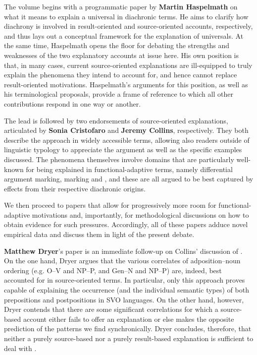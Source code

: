 \documentclass[output=paper]{langsci/langscibook}
\begin{document}
The volume begins with a programmatic paper by \textbf{Martin Haspelmath} on what it means to explain a universal in diachronic terms. He aims to clarify how diachrony is involved in result-oriented and source-oriented accounts, respectively, and thus lays out a  conceptual framework for the explanation of universals. At the same time, Haspelmath opens the floor for debating the strengths and weaknesses of the two explanatory accounts at issue here. His own position is that, in many cases, current source-oriented explanations are ill-equipped to truly explain the phenomena they intend to account for, and hence cannot replace result-oriented motivations. Haspelmath’s arguments for this position, as well as his terminological proposals, provide a frame of reference to which all other contributions respond in one way or another.

The lead  is followed by two endorsements of source-oriented explanations, articulated by \textbf{Sonia Cristofaro} and \textbf{Jeremy Collins}, respectively. They both describe the approach in widely accessible terms, allowing also readers outside of linguistic typology to appreciate the  argument as well as the specific examples discussed. The phenomena themselves involve domains that are particularly well-known for being explained in functional-adaptive terms, namely differential argument marking,  marking and , and these are all argued to be best captured by  effects from their respective diachronic origins.  

We then proceed to papers that allow for progressively more room for functional-adaptive motivations and, importantly, for methodological discussions on how to obtain evidence for such pressures. Accordingly, all of these papers adduce novel empirical data and discuss them in light of the present debate.

\textbf{Matthew Dryer}’s paper is an immediate follow-up on Collins’ discussion of . On the one hand, Dryer argues that the various correlates of adposition–noun ordering (e.g. O–V and NP–P, and Gen–N and NP–P) are, indeed, best accounted for in source-oriented terms. In particular, only this approach proves capable of explaining the occurrence (and the individual semantic types) of both prepositions and postpositions in SVO languages. On the other hand, however, Dryer contends that there are some significant correlations for which a source-based account either fails to offer an explanation or else makes the opposite prediction of the patterns we find synchronically. Dryer concludes, therefore, that neither a purely source-based nor a purely result-based explanation is sufficient to deal with .      
\end{document}
